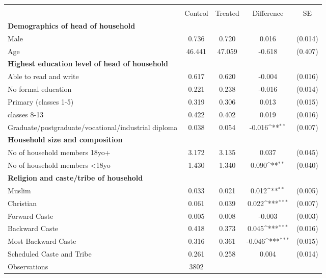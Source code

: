 {
\def\sym#1{\ifmmode^{#1}\else\(^{#1}\)\fi}
\begin{tabular}{l*{1}{cccc}}
\hline\hline
                    &\multicolumn{4}{c}{}                                        \\
                    &     Control&     Treated&  Difference         &          SE\\
\hline
\textbf{Demographics of head of household}&            &            &                     &            \\
Male                &       0.736&       0.720&       0.016         &     (0.014)\\
Age                 &      46.441&      47.059&      -0.618         &     (0.407)\\
\textbf{Highest education level of head of household}&            &            &                     &            \\
Able to read and write&       0.617&       0.620&      -0.004         &     (0.016)\\
No formal education &       0.221&       0.238&      -0.016         &     (0.014)\\
Primary (classes 1-5)&       0.319&       0.306&       0.013         &     (0.015)\\
classes 8-13        &       0.422&       0.402&       0.019         &     (0.016)\\
Graduate/postgraduate/vocational/industrial diploma&       0.038&       0.054&      -0.016\sym{**} &     (0.007)\\
\textbf{Household size and composition}&            &            &                     &            \\
No of household members 18yo+&       3.172&       3.135&       0.037         &     (0.045)\\
No of household members \textless{}18yo&       1.430&       1.340&       0.090\sym{**} &     (0.040)\\
\textbf{Religion and caste/tribe of household}&            &            &                     &            \\
Muslim              &       0.033&       0.021&       0.012\sym{**} &     (0.005)\\
Christian           &       0.061&       0.039&       0.022\sym{***}&     (0.007)\\
Forward Caste       &       0.005&       0.008&      -0.003         &     (0.003)\\
Backward Caste      &       0.418&       0.373&       0.045\sym{***}&     (0.016)\\
Most Backward Caste &       0.316&       0.361&      -0.046\sym{***}&     (0.015)\\
Scheduled Caste and Tribe&       0.261&       0.258&       0.004         &     (0.014)\\
\hline
Observations        &        3802&            &                     &            \\
\hline\hline
\end{tabular}
}

